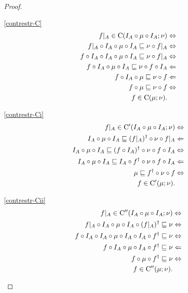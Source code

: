\begin{proof}
~
\begin{widedisorder}
\item [{\ref{contrestr-C}}] ~
\begin{align*}
f|_{A}\in\mathrm{C}(I_{A}\circ\mu\circ I_{A};\nu) & \Leftrightarrow\\
f|_{A}\circ I_{A}\circ\mu\circ I_{A}\sqsubseteq\nu\circ f|_{A} & \Leftrightarrow\\
f\circ I_{A}\circ I_{A}\circ\mu\circ I_{A}\sqsubseteq\nu\circ f|_{A} & \Leftrightarrow\\
f\circ I_{A}\circ\mu\circ I_{A}\sqsubseteq\nu\circ f\circ I_{A} & \Leftarrow\\
f\circ I_{A}\circ\mu\sqsubseteq\nu\circ f & \Leftarrow\\
f\circ\mu\sqsubseteq\nu\circ f & \Leftrightarrow\\
f\in\mathrm{C}(\mu;\nu).
\end{align*}

\item [{\ref{contrestr-Ci}}] ~
\begin{align*}
f|_{A}\in\mathrm{C}'(I_{A}\circ\mu\circ I_{A};\nu) & \Leftrightarrow\\
I_{A}\circ\mu\circ I_{A}\sqsubseteq(f|_{A})^{\dagger}\circ\nu\circ f|_{A} & \Leftarrow\\
I_{A}\circ\mu\circ I_{A}\sqsubseteq(f\circ I_{A})^{\dagger}\circ\nu\circ f\circ I_{A} & \Leftrightarrow\\
I_{A}\circ\mu\circ I_{A}\sqsubseteq I_{A}\circ f^{\dagger}\circ\nu\circ f\circ I_{A} & \Leftarrow\\
\mu\sqsubseteq f^{\dagger}\circ\nu\circ f & \Leftrightarrow\\
f\in\mathrm{C}'(\mu;\nu).
\end{align*}

\item [{\ref{contrestr-Cii}}] ~
\begin{align*}
f|_{A}\in\mathrm{C}''(I_{A}\circ\mu\circ I_{A};\nu) & \Leftrightarrow\\
f|_{A}\circ I_{A}\circ\mu\circ I_{A}\circ(f|_{A})^{\dagger}\sqsubseteq\nu & \Leftrightarrow\\
f\circ I_{A}\circ I_{A}\circ\mu\circ I_{A}\circ I_{A}\circ f^{\dagger}\sqsubseteq\nu & \Leftrightarrow\\
f\circ I_{A}\circ\mu\circ I_{A}\circ f^{\dagger}\sqsubseteq\nu & \Leftarrow\\
f\circ\mu\circ f^{\dagger}\sqsubseteq\nu & \Leftrightarrow\\
f\in\mathrm{C}''(\mu;\nu).
\end{align*}
\end{widedisorder}
\end{proof}

